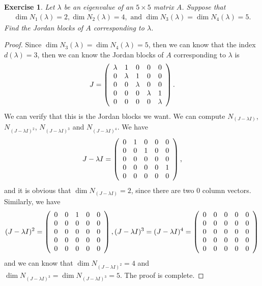 \documentclass[11pt]{book}
\newtheorem{exercise}{Exercise}[section]
\theoremstyle{definition}
\numberwithin{equation}{chapter}
\begin{document}
\begin{exercise}
Let $\lambda$ be an eigenvalue of an $5 \times 5$ matrix $A$. Suppose
that%
\begin{align*}
    \dim N_{1}\left(\lambda\right) = 2, \dim N_{2}\left(\lambda\right) = 4, 
    \text{ and } \dim N_{3}\left(\lambda\right) = \dim N_{4}\left(\lambda\right) = 5.
\end{align*}
Find the Jordan blocks of $A$ corresponding to $\lambda$.
\end{exercise}
\begin{proof}
Since $\dim N_{3}\left(\lambda\right) = \dim N_{4}\left(\lambda\right) = 5$, then we can know that the index $d(\lambda) = 3$, then we can know the Jordan blocks of $A$ corresponding to $\lambda$ is 
\begin{align*}
    J = \left(\begin{array}
    [c]{ccccc}%
    \lambda & 1 & 0 & 0 & 0\\
    0 & \lambda & 1 & 0 & 0\\
    0 & 0 & \lambda & 0 & 0\\
    0 & 0 & 0 & \lambda & 1\\
    0 & 0 & 0 & 0 & \lambda
    \end{array}\right).
\end{align*}
We can verify that this is the Jordan blocks we want. We can compute $N_{(J-\lambda I)}$, $N_{(J-\lambda I)^2}$, $N_{(J-\lambda I)^3}$ and $N_{(J-\lambda I)^4}$. We have
\begin{align*}
    J-\lambda I = \left(\begin{array}
    [c]{ccccc}%
    0 & 1 & 0 & 0 & 0\\
    0 & 0 & 1 & 0 & 0\\
    0 & 0 & 0 & 0 & 0\\
    0 & 0 & 0 & 0 & 1\\
    0 & 0 & 0 & 0 & 0
    \end{array}\right),
\end{align*}
and it is obvious that $\dim N_{(J-\lambda I)} = 2$, since there are two $0$ column vectors. Similarly, we have 
\begin{align*}
    (J-\lambda I)^2 = \left(\begin{array}
    [c]{ccccc}%
    0 & 0 & 1 & 0 & 0\\
    0 & 0 & 0 & 0 & 0\\
    0 & 0 & 0 & 0 & 0\\
    0 & 0 & 0 & 0 & 0\\
    0 & 0 & 0 & 0 & 0
    \end{array}\right), 
    (J-\lambda I)^3 = (J-\lambda I)^4 = \left(\begin{array}
    [c]{ccccc}%
    0 & 0 & 0 & 0 & 0\\
    0 & 0 & 0 & 0 & 0\\
    0 & 0 & 0 & 0 & 0\\
    0 & 0 & 0 & 0 & 0\\
    0 & 0 & 0 & 0 & 0
    \end{array}\right)
\end{align*}
and we can know that $\dim N_{(J-\lambda I)^2} = 4$ and $\dim N_{(J-\lambda I)^3} = \dim N_{(J-\lambda I)^3} = 5$. The proof is complete.
\end{proof}
\end{document}
